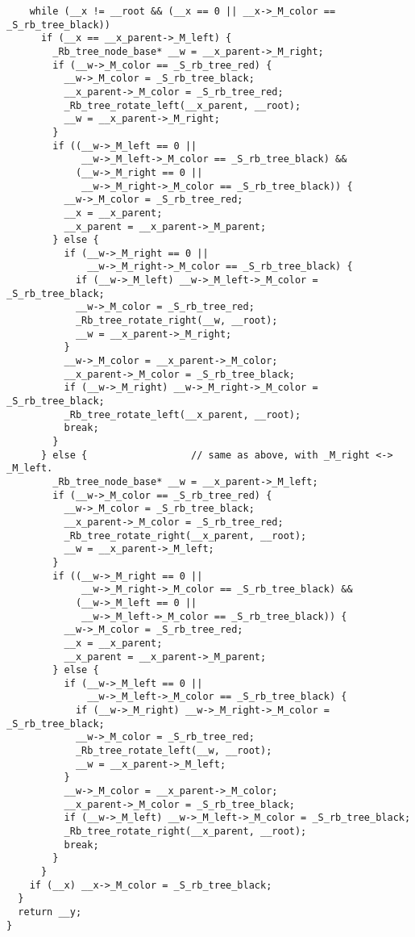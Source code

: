 \documentclass{article}
\begin{document}
\begin{lstlisting}
    while (__x != __root && (__x == 0 || __x->_M_color == _S_rb_tree_black))
      if (__x == __x_parent->_M_left) {
        _Rb_tree_node_base* __w = __x_parent->_M_right;
        if (__w->_M_color == _S_rb_tree_red) {
          __w->_M_color = _S_rb_tree_black;
          __x_parent->_M_color = _S_rb_tree_red;
          _Rb_tree_rotate_left(__x_parent, __root);
          __w = __x_parent->_M_right;
        }
        if ((__w->_M_left == 0 || 
             __w->_M_left->_M_color == _S_rb_tree_black) &&
            (__w->_M_right == 0 || 
             __w->_M_right->_M_color == _S_rb_tree_black)) {
          __w->_M_color = _S_rb_tree_red;
          __x = __x_parent;
          __x_parent = __x_parent->_M_parent;
        } else {
          if (__w->_M_right == 0 || 
              __w->_M_right->_M_color == _S_rb_tree_black) {
            if (__w->_M_left) __w->_M_left->_M_color = _S_rb_tree_black;
            __w->_M_color = _S_rb_tree_red;
            _Rb_tree_rotate_right(__w, __root);
            __w = __x_parent->_M_right;
          }
          __w->_M_color = __x_parent->_M_color;
          __x_parent->_M_color = _S_rb_tree_black;
          if (__w->_M_right) __w->_M_right->_M_color = _S_rb_tree_black;
          _Rb_tree_rotate_left(__x_parent, __root);
          break;
        }
      } else {                  // same as above, with _M_right <-> _M_left.
        _Rb_tree_node_base* __w = __x_parent->_M_left;
        if (__w->_M_color == _S_rb_tree_red) {
          __w->_M_color = _S_rb_tree_black;
          __x_parent->_M_color = _S_rb_tree_red;
          _Rb_tree_rotate_right(__x_parent, __root);
          __w = __x_parent->_M_left;
        }
        if ((__w->_M_right == 0 || 
             __w->_M_right->_M_color == _S_rb_tree_black) &&
            (__w->_M_left == 0 || 
             __w->_M_left->_M_color == _S_rb_tree_black)) {
          __w->_M_color = _S_rb_tree_red;
          __x = __x_parent;
          __x_parent = __x_parent->_M_parent;
        } else {
          if (__w->_M_left == 0 || 
              __w->_M_left->_M_color == _S_rb_tree_black) {
            if (__w->_M_right) __w->_M_right->_M_color = _S_rb_tree_black;
            __w->_M_color = _S_rb_tree_red;
            _Rb_tree_rotate_left(__w, __root);
            __w = __x_parent->_M_left;
          }
          __w->_M_color = __x_parent->_M_color;
          __x_parent->_M_color = _S_rb_tree_black;
          if (__w->_M_left) __w->_M_left->_M_color = _S_rb_tree_black;
          _Rb_tree_rotate_right(__x_parent, __root);
          break;
        }
      }
    if (__x) __x->_M_color = _S_rb_tree_black;
  }
  return __y;
}
\end{lstlisting}
\end{document}
